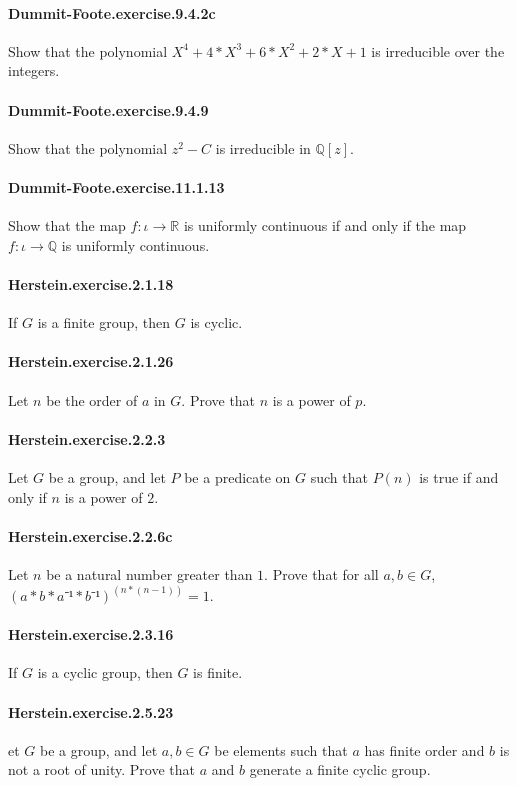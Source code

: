 \documentclass{article}
\begin{document}
\paragraph{Dummit-Foote.exercise.9.4.2c} Show that the polynomial $X^4 + 4*X^3 + 6*X^2 + 2*X + 1$ is irreducible over the integers.

\paragraph{Dummit-Foote.exercise.9.4.9} Show that the polynomial $z^2 - C$ is irreducible in $\mathbb{Q}[z]$.

\paragraph{Dummit-Foote.exercise.11.1.13} Show that the map
  $f : ι → ℝ$ is uniformly continuous if and only if the map $f : ι → ℚ$ is uniformly
  continuous.

\paragraph{Herstein.exercise.2.1.18} If $G$ is a finite group, then $G$ is cyclic.

\paragraph{Herstein.exercise.2.1.26} Let $n$ be the order of $a$ in $G$. Prove that $n$ is a power of $p$.

\paragraph{Herstein.exercise.2.2.3} Let $G$ be a group, and let $P$ be a predicate on $G$ such that $P(n)$ is true if and only if $n$ is a power of $2$.

\paragraph{Herstein.exercise.2.2.6c} Let $n$ be a natural number greater than $1$. Prove that for all $a, b \in G$, $(a * b * a⁻¹ * b⁻¹) ^ (n * (n - 1)) = 1$.

\paragraph{Herstein.exercise.2.3.16} If $G$ is a cyclic group, then $G$ is finite.

\paragraph{Herstein.exercise.2.5.23} et $G$ be a group, and let $a, b \in G$ be elements such that $a$ has finite order and $b$ is not a root of unity. Prove that $a$ and $b$ generate a finite cyclic group.
\end{document}
